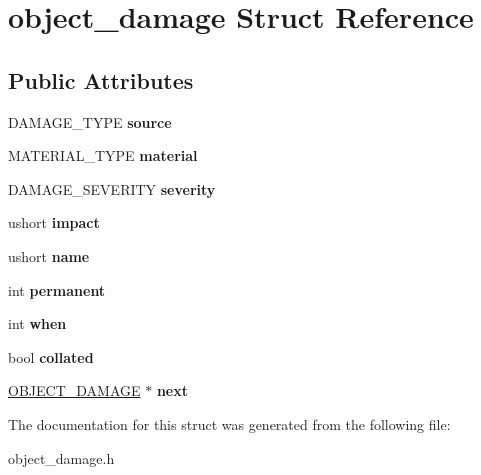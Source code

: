 \hypertarget{structobject__damage}{\section{object\-\_\-damage Struct Reference}
\label{structobject__damage}
}
\subsection*{Public Attributes}
\begin{DoxyCompactItemize}
\item 
\hypertarget{structobject__damage_a108f533495c2f06bfa2b89209f761486}{D\-A\-M\-A\-G\-E\-\_\-\-T\-Y\-P\-E {\bfseries source}}\label{structobject__damage_a108f533495c2f06bfa2b89209f761486}

\item 
\hypertarget{structobject__damage_ad76ebd37225ccd91c58b09cc327b2421}{M\-A\-T\-E\-R\-I\-A\-L\-\_\-\-T\-Y\-P\-E {\bfseries material}}\label{structobject__damage_ad76ebd37225ccd91c58b09cc327b2421}

\item 
\hypertarget{structobject__damage_ac029b8185754dd9abcaa9b5d293f8106}{D\-A\-M\-A\-G\-E\-\_\-\-S\-E\-V\-E\-R\-I\-T\-Y {\bfseries severity}}\label{structobject__damage_ac029b8185754dd9abcaa9b5d293f8106}

\item 
\hypertarget{structobject__damage_a96b1eb5eecd0f396ff5c09f6bdda35d2}{ushort {\bfseries impact}}\label{structobject__damage_a96b1eb5eecd0f396ff5c09f6bdda35d2}

\item 
\hypertarget{structobject__damage_afc74f4142ac05326ca2e12999229d746}{ushort {\bfseries name}}\label{structobject__damage_afc74f4142ac05326ca2e12999229d746}

\item 
\hypertarget{structobject__damage_a1b4e2d08c8a94a65ea4ed403ccb206ae}{int {\bfseries permanent}}\label{structobject__damage_a1b4e2d08c8a94a65ea4ed403ccb206ae}

\item 
\hypertarget{structobject__damage_a1d60581e627a8a3412a25e3bb2efdca5}{int {\bfseries when}}\label{structobject__damage_a1d60581e627a8a3412a25e3bb2efdca5}

\item 
\hypertarget{structobject__damage_aba937db838e9b0413cbabe8785e9b816}{bool {\bfseries collated}}\label{structobject__damage_aba937db838e9b0413cbabe8785e9b816}

\item 
\hypertarget{structobject__damage_ab2a2e8b2f379bd963dd85c903e407ed3}{\hyperlink{structobject__damage}{O\-B\-J\-E\-C\-T\-\_\-\-D\-A\-M\-A\-G\-E} $\ast$ {\bfseries next}}\label{structobject__damage_ab2a2e8b2f379bd963dd85c903e407ed3}

\end{DoxyCompactItemize}


The documentation for this struct was generated from the following file\-:\begin{DoxyCompactItemize}
\item 
object\-\_\-damage.\-h\end{DoxyCompactItemize}
